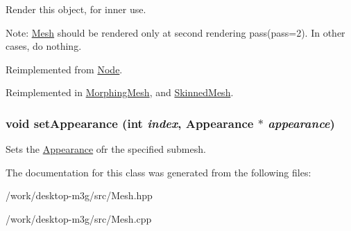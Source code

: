 Render this object, for inner use.

Note: \hyperlink{classm3g_1_1Mesh}{Mesh} should be rendered only at second rendering pass(pass=2). In other cases, do nothing. 

Reimplemented from \hyperlink{classm3g_1_1Node_1efcb1973989d9963d5bd6d03065d389}{Node}.

Reimplemented in \hyperlink{classm3g_1_1MorphingMesh_1efcb1973989d9963d5bd6d03065d389}{MorphingMesh}, and \hyperlink{classm3g_1_1SkinnedMesh_1efcb1973989d9963d5bd6d03065d389}{SkinnedMesh}.\hypertarget{classm3g_1_1Mesh_bb03b872c453c4f8f3fe31e8b54d1b52}{
\subsubsection[{setAppearance}]{\setlength{\rightskip}{0pt plus 5cm}void setAppearance (int {\em index}, \/  {\bf Appearance} $\ast$ {\em appearance})}}
\label{classm3g_1_1Mesh_bb03b872c453c4f8f3fe31e8b54d1b52}


Sets the \hyperlink{classm3g_1_1Appearance}{Appearance} ofr the specified submesh. 

The documentation for this class was generated from the following files:\begin{CompactItemize}
\item 
/work/desktop-m3g/src/Mesh.hpp\item 
/work/desktop-m3g/src/Mesh.cpp\end{CompactItemize}
